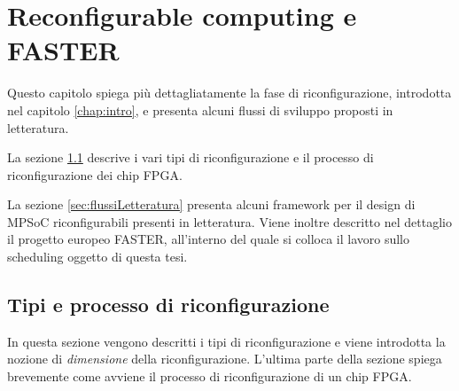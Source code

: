 \chapter{Reconfigurable computing e \acs{FASTER}}
\label{chap:recComputingFASTER}
\vspace{1cm}
Questo capitolo spiega pi\`u dettagliatamente la fase di riconfigurazione,
introdotta nel capitolo \ref{chap:intro}, e presenta alcuni flussi di sviluppo
proposti in letteratura.

La sezione \ref{sec:recComputingDettagli} descrive i vari tipi di riconfigurazione
e il processo di riconfigurazione dei chip \ac{FPGA}.

La sezione \ref{sec:flussiLetteratura} presenta alcuni framework per il design
di \ac{MPSoC} riconfigurabili presenti in letteratura. Viene inoltre descritto nel
dettaglio il progetto europeo \acs{FASTER}, all'interno del quale si colloca il lavoro
sullo scheduling oggetto di questa tesi.

\newpage

\section{Tipi e processo di riconfigurazione}
\label{sec:recComputingDettagli}
In questa sezione vengono descritti i tipi di riconfigurazione e viene introdotta
la nozione di \emph{dimensione} della riconfigurazione. L'ultima parte della sezione
spiega brevemente come avviene il processo di riconfigurazione di un chip \ac{FPGA}.
